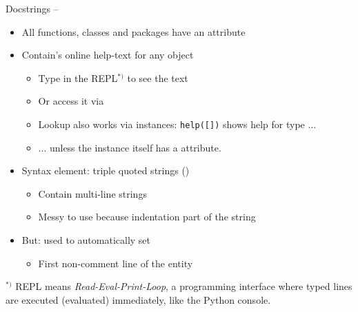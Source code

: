 
\begin{frame}[fragile]{Docstrings -- }
%
\vspace{-3pt}
\begin{itemize}
\item All functions, classes and packages have an attribute 
\item Contain's online help-text for any object
	\begin{itemize}
	\item Type  in the REPL$^{*)}$ to see the text
	\item Or access it via  
	\item Lookup also works via instances: \texttt{help([])} shows help for type  ...
	\item ... unless the instance itself has a  attribute.
	\end{itemize}
\item Syntax element: triple quoted strings ()
	\begin{itemize}
	\item Contain multi-line strings
	\item Messy to use because indentation part of the string
	\end{itemize}
\item But: used to automatically set  
	\begin{itemize}
	\item First non-comment line of the entity
	\end{itemize}
\end{itemize}
%
\vspace{-6pt}
\begin{hintbox}[REPL]
\footnotesize
$^{*)}$ REPL means \emph{Read-Eval-Print-Loop}, \ie a programming interface where typed lines are executed (evaluated) immediately, like the Python console.
\end{hintbox}
%
\end{frame}


